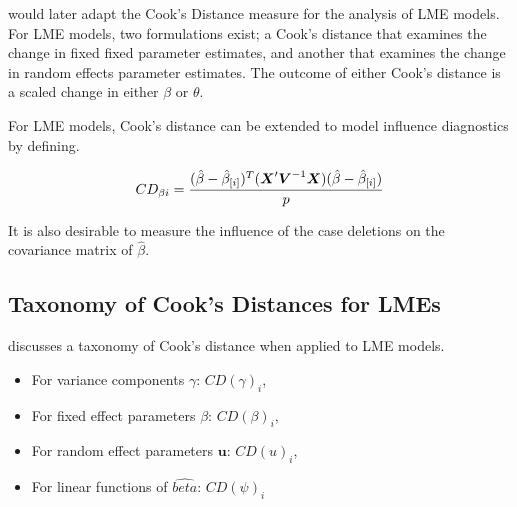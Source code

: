 \documentclass[12pt, a4paper]{report}
\theoremstyle{plain}
\theoremstyle{definition}
\theoremstyle{remark}
\begin{document}
%
%
\citet{Christensen} would later adapt the Cook's Distance measure for the analysis of LME models. For LME models, two formulations exist; a Cook's distance that examines the change in fixed fixed parameter estimates, and another that examines the change in random effects parameter estimates. The outcome of either Cook's distance is a scaled change in either $\beta$ or $\theta$.

For LME models, Cook's distance can be extended to model influence diagnostics by defining.

\[ CD_{\beta i} = {(\hat{\beta} - \hat{\beta}_{[i]})^{T}(\boldsymbol{X}^{\prime}\boldsymbol{V}^{-1}\boldsymbol{X}) (\hat{\beta} - \hat{\beta}_{[i]}) \over p}\]

It is also desirable to measure the influence of the case deletions on the covariance matrix of $\hat{\beta}$.

\subsection{Taxonomy of Cook's Distances for LMEs}
\citet{schabenberger} discusses a taxonomy of Cook's distance when applied to LME models. \begin{itemize}
	\item For variance components $\gamma$: $CD(\gamma)_i$,
	\item For fixed effect parameters $\beta$: $CD(\beta)_i$,
	\item For random effect parameters $\boldsymbol{u}$: $CD(u)_i$,
	\item For linear functions of $\hat{beta}$: $CD(\psi)_i$
\end{itemize}			
\end{document}
